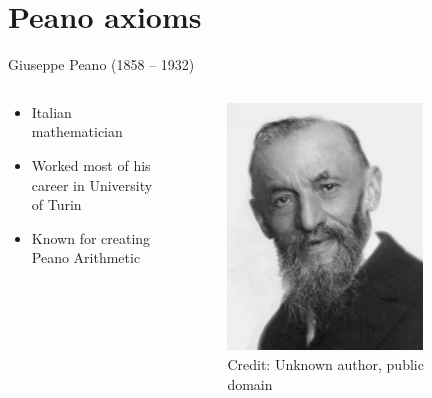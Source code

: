 \documentclass[utf8]{beamer}
\begin{document}
\part{Peano axioms}
\begin{frame}
\partpage
\end{frame}

\begin{frame}{Giuseppe Peano (1858 – 1932)}
\begin{columns}
\begin{column}{0.6\textwidth}
\begin{itemize}
\item Italian mathematician
\item Worked most of his career in University of Turin
\item Known for creating Peano Arithmetic
\end{itemize}
\end{column}
\begin{column}{0.4\textwidth}
\begin{figure}
\centering
\includegraphics[width=0.8\textwidth]{images/peano.jpg}
\\
\tiny Credit: Unknown author, public domain
\end{figure}
\end{column}
\end{columns}
\end{frame}
\end{document}
